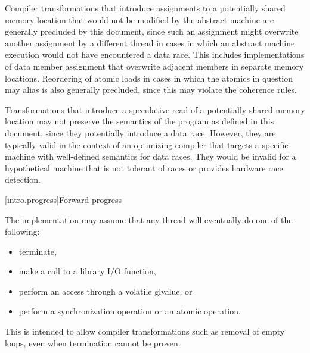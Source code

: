 \pnum
\begin{note} Compiler transformations that introduce assignments to a potentially
shared memory location that would not be modified by the abstract machine are
generally precluded by this document, since such an assignment might overwrite
another assignment by a different thread in cases in which an abstract machine
execution would not have encountered a data race. This includes implementations
of data member assignment that overwrite adjacent members in separate memory
locations. Reordering of atomic loads in cases in which the atomics in question
may alias is also generally precluded, since this may violate the coherence
rules. \end{note}

\pnum
\begin{note} Transformations that introduce a speculative read of a potentially
shared memory location may not preserve the semantics of the \Cpp{} program as
defined in this document, since they potentially introduce a data race. However,
they are typically valid in the context of an optimizing compiler that targets a
specific machine with well-defined semantics for data races. They would be
invalid for a hypothetical machine that is not tolerant of races or provides
hardware race detection. \end{note}

[intro.progress]{Forward progress}

\pnum
The implementation may assume that any thread will eventually do one of the
following:
\begin{itemize}
\item terminate,
\item make a call to a library I/O function,
\item perform an access through a volatile glvalue, or
\item perform a synchronization operation or an atomic operation.
\end{itemize}
\begin{note} This is intended to allow compiler transformations such as removal of
empty loops, even when termination cannot be proven. \end{note}

